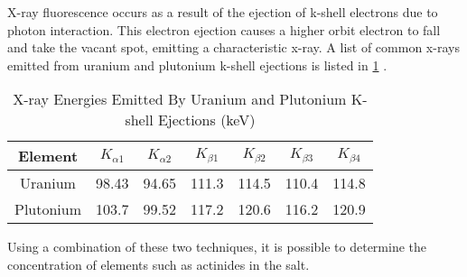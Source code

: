 X-ray fluorescence occurs as a result of the ejection of k-shell electrons due to photon interaction. This electron ejection causes a higher orbit electron to fall and take the vacant spot, emitting a characteristic x-ray. A list of common x-rays emitted from uranium and plutonium k-shell ejections is listed in \ref{xrays-uranium-plutonium} \cite{Cook2015}. 

\begin{table}[hb]
\caption{X-ray Energies Emitted By Uranium and Plutonium K-shell Ejections (keV)}
\label{xrays-uranium-plutonium}
\begin{center}
\begin{tabular}[b]{|c|c|c|c|c|c|c|}
	\hline
	Element & $K_{\alpha1}$ & $K_{\alpha2}$ & $K_{\beta1}$ & $K_{\beta2}$ & $K_{\beta3}$ & $K_{\beta4}$\\ \hline
	Uranium & 98.43 & 94.65 & 111.3 & 114.5 & 110.4 & 114.8 \\ \hline
	Plutonium & 103.7 & 99.52 & 117.2 & 120.6 & 116.2 & 120.9\\ \hline

\end{tabular}
\end{center}
\end{table}

Using a combination of these two techniques, it is possible to determine the concentration of elements such as actinides in the salt. 



